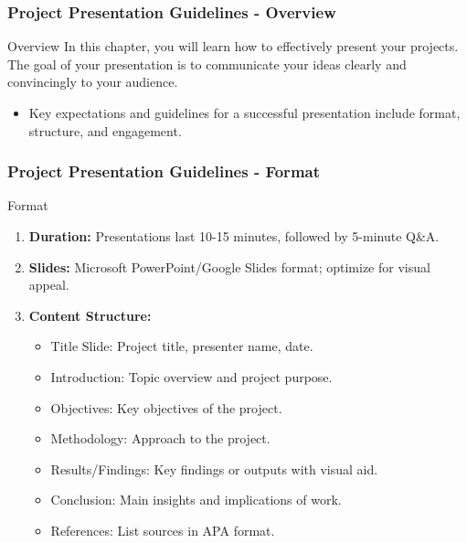 \documentclass[aspectratio=169]{beamer}
\begin{document}
\begin{frame}[fragile]
    \frametitle{Project Presentation Guidelines - Overview}
    \begin{block}{Overview}
        In this chapter, you will learn how to effectively present your projects. 
        The goal of your presentation is to communicate your ideas clearly and convincingly to your audience.
    \end{block}
    \begin{itemize}
        \item Key expectations and guidelines for a successful presentation include format, structure, and engagement.
    \end{itemize}
\end{frame}

\begin{frame}[fragile]
    \frametitle{Project Presentation Guidelines - Format}
    \begin{block}{Format}
        \begin{enumerate}
            \item \textbf{Duration:} Presentations last 10-15 minutes, followed by 5-minute Q\&A.
            \item \textbf{Slides:} Microsoft PowerPoint/Google Slides format; optimize for visual appeal.
            \item \textbf{Content Structure:}
                \begin{itemize}
                    \item Title Slide: Project title, presenter name, date.
                    \item Introduction: Topic overview and project purpose.
                    \item Objectives: Key objectives of the project.
                    \item Methodology: Approach to the project.
                    \item Results/Findings: Key findings or outputs with visual aid.
                    \item Conclusion: Main insights and implications of work.
                    \item References: List sources in APA format.
                \end{itemize}
        \end{enumerate}
    \end{block}
\end{frame}
\end{document}
